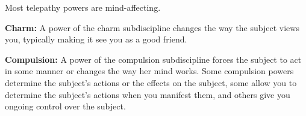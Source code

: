 Most telepathy powers are mind-affecting.


\textbf{Charm:} A power of the charm subdiscipline changes the way the subject views you, typically making it see you as a good friend.

\textbf{Compulsion:} A power of the compulsion subdiscipline forces the subject to act in some manner or changes the way her mind works. Some compulsion powers determine the subject's actions or the effects on the subject, some allow you to determine the subject's actions when you manifest them, and others give you ongoing control over the subject.